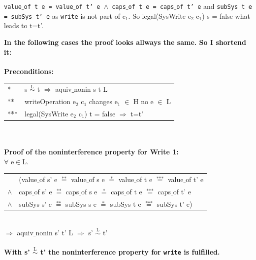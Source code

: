 \documentclass[11pt,a4paper,twoside]{article}
\begin{document}
{\begin{itemize}
\texttt{value$\_$of t e = value$\_$of t' e $\wedge$ caps$\_$of t e = caps$\_$of t' e} and \texttt{subSys t e = subSys t' e} as \texttt{write} is not part of c$_1$. So legal(SysWrite e$_2$ c$_1$) s = false what leads to t=t'. \\
\end{itemize} 
\textbf{In the following cases the proof looks allways the same. So I shortend it:} \\ \\
\textbf{Preconditions:} \\ 
\begin{tabular}{ll}
* & s $\overset{\text{L}}{\sim}$ t $\Rightarrow$ aquiv$\_$nonin s t L	\\ 
** & writeOperation e$_2$ c$_1$  changes e$_1$ $\in$ H no e $\in$ L \\
*** & legal(SysWrite e$_2$ c$_1$) t = false $\Rightarrow$ t=t'
\end{tabular} \\ \\ 
\textbf{Proof of the noninterference property for Write 1:} \\ 
$\forall$ e$\in$L. \\
\begin{tabular}{ll}
& (value$\_$of s' e $\overset{\text{**}}{=}$ value$\_$of s e $\overset{\text{*}}{=}$ value$\_$of t e $\overset{\text{***}}{=}$ value$\_$of t' e \\
$\wedge$ & caps$\_$of s' e $\overset{\text{**}}{=}$ caps$\_$of s e $\overset{\text{*}}{=}$ caps$\_$of t e $\overset{\text{***}}{=}$ caps$\_$of t' e \\
$\wedge$ & subSys s' e $\overset{\text{**}}{=}$ subSys s e $\overset{\text{*}}{=}$ subSys t e $\overset{\text{***}}{=}$ subSys t' e)
\end{tabular} \\
$\Rightarrow$ aquiv$\_$nonin s' t' L $\Rightarrow$ s' $\overset{\text{L}}{\sim}$ t' \\ \\
\textbf{With s' $\overset{\text{L}}{\sim}$ t' the noninterference property for \texttt{write} is fulfilled.} 
\newpage
}
\end{document}

